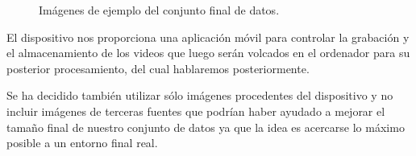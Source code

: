 \begin{figure}[H]
    \centering
	\hspace{0.05\linewidth}
	\hspace{0.05\linewidth}
	\hspace{0.05\linewidth}
    \caption[Imágenes de ejemplo del conjunto final de datos]{Imágenes de ejemplo del conjunto final de datos.}
    \label{fig-dataset-imagenes-ejemplo}
\end{figure}
\medskip

El dispositivo nos proporciona una aplicación móvil para controlar la grabación y el almacenamiento de los videos que luego serán volcados en el ordenador para su posterior procesamiento, del cual hablaremos posteriormente.
\medskip


Se ha decidido también utilizar sólo imágenes procedentes del dispositivo y no incluir imágenes de terceras fuentes que podrían haber ayudado a mejorar el tamaño final de nuestro conjunto de datos ya que la idea es acercarse lo máximo posible a un entorno final real.
\medskip

